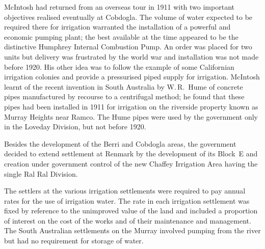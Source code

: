 McIntosh had returned from an overseas tour in 1911 with two important
objectives realised eventually at Cobdogla.  The volume of water
expected to be required there for irrigation warranted the
installation of a powerful and economic pumping plant; the best
available at the time appeared to be the distinctive Humphrey Internal
Combustion Pump.  An order was placed for two
units but delivery was frustrated by the world war and installation
was not made before 1920.  His other idea was to follow the example of
some Californian irrigation colonies and provide a pressurised piped
supply for irrigation.  McIntosh learnt of the recent invention in
South Australia by W.\,R.~Hume  of concrete pipes
manufactured by recourse to a centrifugal method; he found that these
pipes had been installed in 1911 for irrigation on the riverside
property known as Murray Heights near Ramco.  The Hume pipes
 were used by the government only in the Loveday
Division, but not before 1920.

Besides the development of the Berri and Cobdogla areas, the
government decided to extend settlement at Renmark by the development
of its Block~E and creation under government control of the new
Chaffey Irrigation Area  having the
single Ral Ral Division.

The settlers at the various irrigation settlements were required to
pay annual rates for the use of irrigation water.  The rate in each
irrigation settlement was fixed by reference to the unimproved value
of the land and included a proportion of interest on the cost of the
works and of their maintenance and management.  The South Australian
settlements on the Murray involved pumping from the river but had no
requirement for storage of water.

